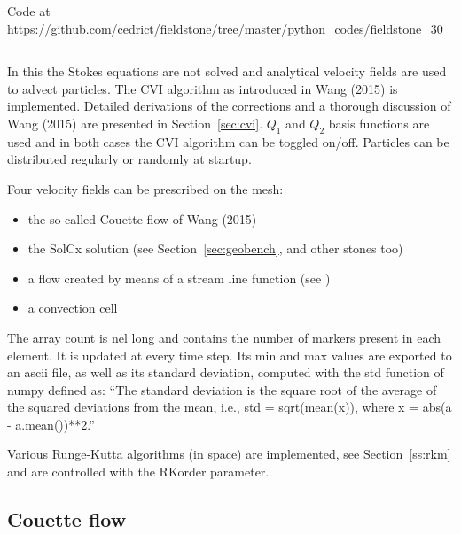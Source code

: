 


\begin{center}
Code at \url{https://github.com/cedrict/fieldstone/tree/master/python_codes/fieldstone_30}
\end{center}

\par\noindent\rule{\textwidth}{0.4pt}

In this \stone the Stokes equations are not solved and analytical 
velocity fields are used to advect particles. The CVI algorithm 
as introduced in Wang \etal (2015) \cite{waav15} is implemented.
Detailed derivations of the corrections and a thorough discussion 
of Wang \etal (2015) are presented in Section~\ref{sec:cvi}.
$Q_1$ and $Q_2$ basis functions are used and in both cases the CVI algorithm can be toggled on/off. 
Particles can be distributed regularly or randomly at startup.

Four velocity fields can be prescribed on the mesh:
\begin{itemize}
\item the so-called Couette flow of Wang \etal (2015) \cite{waav15} 
\item the SolCx solution (see Section~\ref{sec:geobench}, and  other stones too)
\item a flow created by means of a stream line function (see )
\item a convection cell 
\end{itemize}

The array {\python count} is {\python nel} long and contains the number of markers present in each element.
It is updated at every time step. Its min and max values are exported to an ascii file, as well 
as its standard deviation, computed with the {\python std} function of numpy defined as:
``The standard deviation is the square root of the average of the squared deviations from the mean, 
i.e., std = sqrt(mean(x)), where x = abs(a - a.mean())**2.''

Various Runge-Kutta algorithms (in space) are implemented, see Section~\ref{ss:rkm} and are 
controlled with the {\python RKorder} parameter.

\subsection*{Couette flow}

